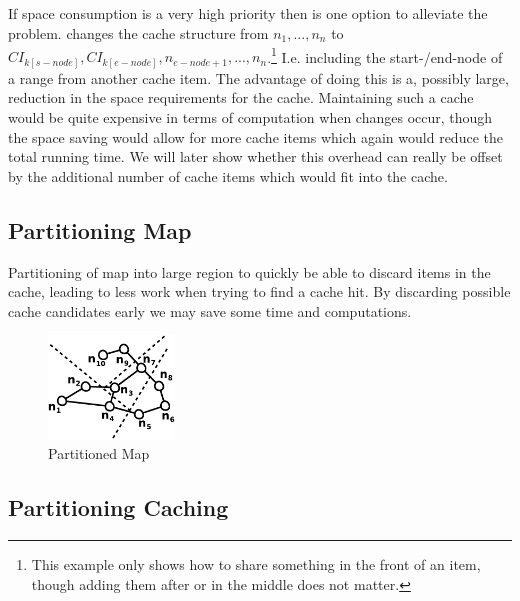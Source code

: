 \subsection{\sps}

If space consumption is a very high priority then \sps is one option to alleviate the problem. \sps changes the cache structure from $n_1, ... , n_n$ to $CI_{k\left[s-node\right]},CI_{k\left[e-node\right]}, n_{e-node+1}, ... , n_n$.\footnote{This example only shows how to share something in the front of an item, though adding them after or in the middle does not matter.}
I.e. including the start-/end-node of a range from another cache item. The advantage of doing this is a, possibly large, reduction in the space requirements for the cache. Maintaining such a cache would be quite expensive in terms of computation when changes occur, though the space saving would allow for more cache items which again would reduce the total running time. We will later show whether this overhead can really be offset by the additional number of cache items which would fit into the cache.


\subsection{Partitioning Map}\label{sec:partionmap}

Partitioning of map into large region to quickly be able to discard items in the cache, leading to less work when trying to find a cache hit. By discarding possible \spath cache candidates early we may save some time and computations.


\begin{figure}
  \center
	\includegraphics[width=0.30\textwidth]{figures/mapPartition.pdf}
	\caption{Partitioned Map}
  \label{fig:mappartition}
\end{figure}

\subsection{Partitioning Caching} 

